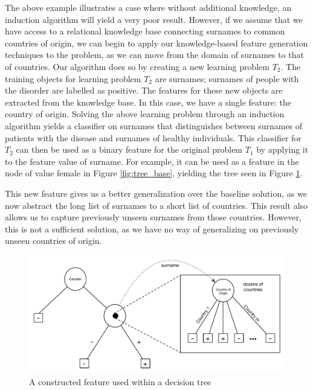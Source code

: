 \documentclass[twoside,11pt]{article}
\theoremstyle{definition}
\begin{document}
The above example illustrates a case where without additional knowledge, an induction algorithm will yield a very poor result. %
However, if we assume that we have access to a relational knowledge base connecting surnames to common countries of origin, we can begin to apply our knowledge-based feature generation techniques to the problem, as we can move from the domain of surnames to that of countries. 
Our algorithm does so by creating a new learning problem $T_2$. The training objects for learning problem $T_2$ are surnames; surnames of people with the disorder are labelled as positive. The features for these new objects are extracted from the knowledge base. In this case, we have a single feature: the country of origin.
Solving the above learning problem through an induction algorithm yields a classifier on surnames that distinguishes between surnames of patients with the disease and surnames of healthy individuals. This classifier for $T_2$ can then be used as a binary feature for the original problem $T_1$ by applying it to the feature value of surname. For example, it can be used as a feature in the node of value female in Figure \ref{fig:tree_base}, yielding the tree seen in Figure \ref{fig:lvl1_tree}. 

This new feature gives us a better generalization over the baseline solution, as we now abstract the long list of surnames to a short list of countries. %
This result also allows us to capture previously unseen surnames from those countries. However, this is not a sufficient solution, as we have no way of generalizing on previously unseen countries of origin. %


\begin{figure}[h]
	\centering
	\includegraphics[width=\linewidth]{fig2.pdf}
	\caption{A constructed feature used within a decision tree}
	\label{fig:lvl1_tree}
\end{figure}
\end{document}
